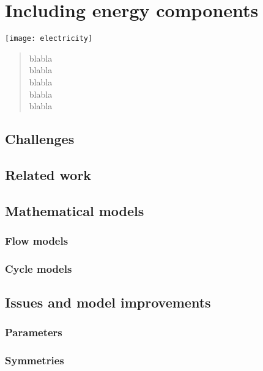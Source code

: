 \chapter{Including energy components} \label{chap:energy}
\begin{bibunit}[ieeetr]
\minitoc
\vspace{2cm}

\begin{minipage}[c]{0.45\linewidth}
\texttt{[image: electricity]}
\end{minipage}
\hfill
\begin{minipage}[c]{0.45\linewidth}
\begin{abstract}
blabla\\
blabla\\
blabla\\
blabla\\
blabla\\
\end{abstract}
\end{minipage}

\newpage
\section{Challenges}


\newpage
\section{Related work}


\newpage
\section{Mathematical models}
\subsection{Flow models}
\subsection{Cycle models}


\newpage
\section{Issues and model improvements}
\subsection{Parameters}
\subsection{Symmetries}

\end{bibunit}
